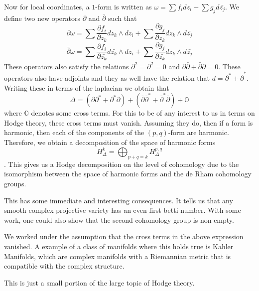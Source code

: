 \documentclass[12pt]{article}
\begin{document}
Now for local coordinates, a $1$-form is written as $ \omega = \sum f_i dz_i + \sum g_j d\bar{z_j}$. We define two new operators $\partial$ and $\bar{\partial}$ such that $$ \partial \omega = \sum \frac{\partial f_i}{\partial z_k}dz_k \wedge dz_i + \sum \frac{\partial g_j}{\partial z_k}dz_k \wedge d\bar{z_j}$$
$$ \bar{\partial} \omega = \sum \frac{\partial f_i}{\partial \bar{z_k}}d\bar{z_k} \wedge dz_i + \sum \frac{\partial g_j}{\partial \bar{z_k}}dz_k \wedge d\bar{z_j}$$
These operators also satisfy the relations $\partial^2 = \bar{\partial^2} = 0$ and $\partial \bar{\partial} + \bar{\partial}\partial = 0$. These operators also have adjoints and they as well have the relation that $d = \partial^* + \bar{\partial}^*$. Writing these in terms of the laplacian we obtain that $$ \Delta = (\partial \partial^* + \partial^* \partial ) + (\bar{\partial}\bar{\partial}^* + \bar{\partial}^*\bar{\partial}) + \mathbb{O} $$
where $\mathbb{O}$ denotes some cross terms. 
For this to be of any interest to us in terms on Hodge theory, these cross terms must vanish. Assuming they do, then if a form is harmonic, then each of the components of the $(p,q)$-form are harmonic. Therefore, we obtain a decomposition of the space of harmonic forms $$H_{\Delta}^k = \bigoplus _{p+q = k} H_{\Delta}^{p,q}$$.
This gives us a Hodge decomposition on the level of cohomology due to the isomorphism between the space of harmonic forms and the de Rham cohomology groups.

This has some immediate and interesting consequences. It tells us that any smooth complex projective variety has an even first betti number. With some work, one could also show that the second cohomology group is non-empty.

We worked under the assumption that the cross terms in the above expression vanished. A example of a class of manifolds where this holds true is Kahler Manifolds, which are complex manifolds with a Riemannian metric that is compatible with the complex structure.

This is just a small portion of the large topic of Hodge theory.
\end{document}
